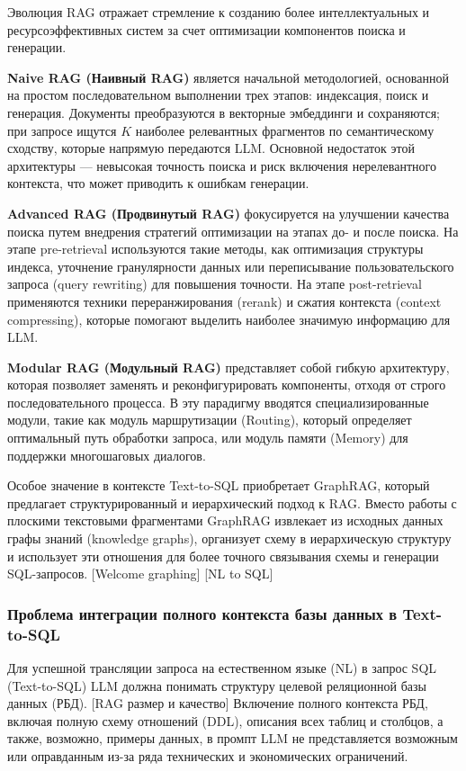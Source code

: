 Эволюция RAG отражает стремление к созданию более интеллектуальных и ресурсоэффективных систем за счет оптимизации компонентов поиска и генерации.

\textbf{Naive RAG (Наивный RAG)} является начальной методологией, основанной на простом последовательном выполнении трех этапов: индексация, поиск и генерация. Документы преобразуются в векторные эмбеддинги и сохраняются; при запросе ищутся $K$ наиболее релевантных фрагментов по семантическому сходству, которые напрямую передаются LLM. Основной недостаток этой архитектуры — невысокая точность поиска и риск включения нерелевантного контекста, что может приводить к ошибкам генерации.

\textbf{Advanced RAG (Продвинутый RAG)} фокусируется на улучшении качества поиска путем внедрения стратегий оптимизации на этапах до- и после поиска. На этапе pre-retrieval используются такие методы, как оптимизация структуры индекса, уточнение гранулярности данных или переписывание пользовательского запроса (query rewriting) для повышения точности. На этапе post-retrieval применяются техники переранжирования (rerank) и сжатия контекста (context compressing), которые помогают выделить наиболее значимую информацию для LLM.

\textbf{Modular RAG (Модульный RAG)} представляет собой гибкую архитектуру, которая позволяет заменять и реконфигурировать компоненты, отходя от строго последовательного процесса. В эту парадигму вводятся специализированные модули, такие как модуль маршрутизации (Routing), который определяет оптимальный путь обработки запроса, или модуль памяти (Memory) для поддержки многошаговых диалогов.

Особое значение в контексте Text-to-SQL приобретает GraphRAG, который предлагает структурированный и иерархический подход к RAG. Вместо работы с плоскими текстовыми фрагментами GraphRAG извлекает из исходных данных графы знаний (knowledge graphs), организует схему в иерархическую структуру и использует эти отношения для более точного связывания схемы и генерации SQL-запросов. [Welcome graphing] [NL to SQL]

\subsubsection{Проблема интеграции полного контекста базы данных в Text-to-SQL}

Для успешной трансляции запроса на естественном языке (NL) в запрос SQL (Text-to-SQL) LLM должна понимать структуру целевой реляционной базы данных (РБД). [RAG размер и качество] Включение полного контекста РБД, включая полную схему отношений (DDL), описания всех таблиц и столбцов, а также, возможно, примеры данных, в промпт LLM не представляется возможным или оправданным из-за ряда технических и экономических ограничений.

